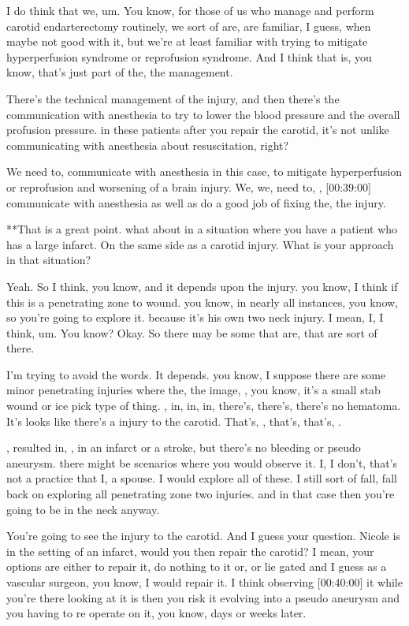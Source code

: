 \documentclass[
]{book}
\begin{document}
I do think that we, um. You know, for those of us who manage and perform
carotid endarterectomy routinely, we sort of are, are familiar, I guess,
when maybe not good with it, but we're at least familiar with trying to
mitigate hyperperfusion syndrome or reprofusion syndrome. And I think
that is, you know, that's just part of the, the management.

There's the technical management of the injury, and then there's the
communication with anesthesia to try to lower the blood pressure and the
overall profusion pressure. in these patients after you repair the
carotid, it's not unlike communicating with anesthesia about
resuscitation, right?

We need to, communicate with anesthesia in this case, to mitigate
hyperperfusion or reprofusion and worsening of a brain injury. We, we,
need to, , {[}00:39:00{]} communicate with anesthesia as well as do a good
job of fixing the, the injury.

**That is a great point. what
about in a situation where you have a patient who has a large infarct.
On the same side as a carotid injury. What is your approach in that
situation?

Yeah. So I
think, you know, and it depends upon the injury. you know, I think
if this is a penetrating zone to wound. you know, in nearly all
instances, you know, so you're going to explore it. because it's his
own two neck injury. I mean, I, I think, um. You know? Okay. So
there may be some that are, that are sort of there.

I'm trying to avoid the words. It depends. you know, I suppose there
are some minor penetrating injuries where the, the image, , you know,
it's a small stab wound or ice pick type of thing. , in, in, in,
there's, there's, there's no hematoma. It's looks like there's a injury
to the carotid. That's, , that's, that's, .

, resulted in, , in an infarct or a stroke, but there's no bleeding or
pseudo aneurysm. there might be scenarios where you would observe
it. I, I don't, that's not a practice that I, a spouse. I would explore
all of these. I still sort of fall, fall back on exploring all
penetrating zone two injuries. and in that case then you're going to
be in the neck anyway.

You're going to see the injury to the carotid. And I guess your
question. Nicole is in the setting of an infarct, would you then repair
the carotid? I mean, your options are either to repair it, do
nothing to it or, or lie gated and I guess as a vascular surgeon,
you know, I would repair it. I think observing {[}00:40:00{]} it while
you're there looking at it is then you risk it evolving into a pseudo
aneurysm and you having to re operate on it, you know, days or weeks
later.
\end{document}
